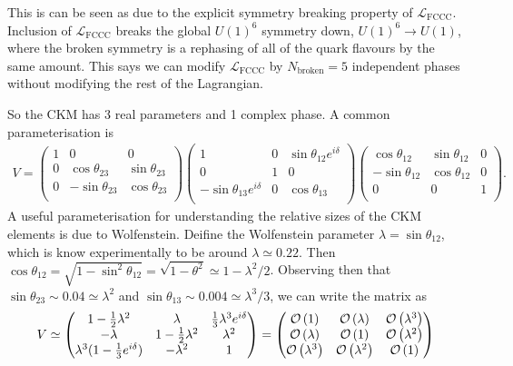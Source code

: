 This is can be seen as due to the explicit symmetry breaking property of $\mathcal{L}_{\text{FCCC}}$. Inclusion of $\mathcal{L}_{\text{FCCC}}$ breaks the global $U(1)^6$  symmetry down, $U(1)^6 \to U(1)$, where the broken symmetry is a rephasing of all of the quark flavours by the same amount. This says we can modify $\mathcal{L}_{\text{FCCC}}$ by $N_{\text{broken}} = 5$ independent phases without modifying the rest of the Lagrangian.

So the CKM has 3 real parameters and 1 complex phase. A common parameterisation is
\begin{align}
  V =
  \begin{pmatrix}
    1 & 0 & 0 \\
    0 & \cos\theta_{23} & \sin\theta_{23} \\
    0 & -\sin\theta_{23} & \cos\theta_{23} \\
  \end{pmatrix}
  \begin{pmatrix}
    1 & 0 & \sin\theta_{12}e^{i\delta} \\
    0 & 1 & 0  \\
    -\sin\theta_{13} e^{i\delta} & 0 & \cos\theta_{13} \\
  \end{pmatrix}
  \begin{pmatrix}
    \cos\theta_{12} & \sin\theta_{12} & 0  \\
    -\sin\theta_{12} & \cos\theta_{12} & 0 \\
    0 & 0 & 1 \\
  \end{pmatrix}.
\end{align}
A useful parameterisation for understanding the relative sizes of the CKM elements is due to Wolfenstein. Deifine the Wolfenstein parameter $\lambda = \sin\theta_{12}$, which is know experimentally to be around $\lambda\simeq 0.22$. Then $\cos\theta_{12} = \sqrt{1-\sin^2\theta_{12}} = \sqrt{1-\theta^2} \simeq 1 - \lambda^2/2$. Observing then that $\sin\theta_{23} \sim 0.04 \simeq \lambda^2$ and $\sin\theta_{13} \sim 0.004 \simeq \lambda^3/3$, we can write the matrix as
\begin{align}
  V \simeq
  \begin{pmatrix}
    1 - {1\over 2}\lambda^2 & \lambda & {1\over 3} \lambda^3 e^{i\delta}  \\
    - \lambda & 1 - {1\over 2}\lambda^2 & \lambda^2 \\
    \lambda^3(1-{1\over3} e^{i\delta}) & -\lambda^2 & 1 \\
  \end{pmatrix}
  =
    \begin{pmatrix}
    \mathcal{O}\left( 1 \right) & \mathcal{O}\left( \lambda \right) & \mathcal{O}\left( \lambda^3 \right)  \\
    \mathcal{O}\left( \lambda \right) & \mathcal{O}\left( 1 \right) & \mathcal{O}\left( \lambda^2 \right) \\
    \mathcal{O}\left( \lambda^3 \right) & \mathcal{O}\left( \lambda^2 \right) & \mathcal{O}\left( 1 \right) \\
  \end{pmatrix}
\end{align}
